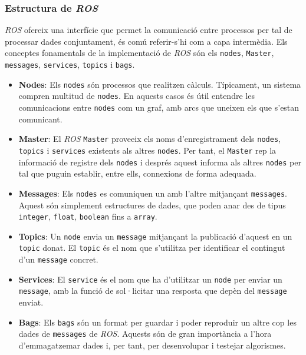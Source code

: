 \documentclass[12pt,a4paper,final,twoside]{report}
\begin{document}
\subsubsection{Estructura de \textit{ROS}}

\textit{ROS} ofereix una interfície que permet la comunicació entre processos per tal de processar dades conjuntament, és comú referir-s'hi com a capa intermèdia. Els conceptes fonamentals de la implementació de \textit{ROS} són els \texttt{nodes}, \texttt{Master}, \texttt{messages}, \texttt{services}, \texttt{topics} i \texttt{bags}.

\begin{itemize}
\item \textbf{Nodes}: Els \texttt{nodes} són processos que realitzen càlculs. Típicament, un sistema compren multitud de \texttt{nodes}. En aquests casos és útil entendre les comunicacions entre \texttt{nodes} com un graf, amb arcs que uneixen els que s'estan comunicant.

\item \textbf{Master}: El \textit{ROS} \texttt{Master} proveeix els noms d'enregistrament dels \texttt{nodes}, \texttt{topics} i \texttt{services} existents als altres \texttt{nodes}. Per tant, el \texttt{Master} rep la informació de registre dels \texttt{nodes} i després aquest informa als altres \texttt{nodes} per tal que puguin establir, entre ells, connexions de forma adequada. 

\item \textbf{Messages}: Els \texttt{nodes} es comuniquen un amb l'altre mitjançant \texttt{messages}. Aquest són simplement estructures de dades, que poden anar des de tipus \texttt{integer}, \texttt{float}, \texttt{boolean} fins a \texttt{array}.

\item \textbf{Topics}: Un \texttt{node} envia un \texttt{message} mitjançant la publicació d'aquest en un \texttt{topic} donat. El \texttt{topic} és el nom que s'utilitza per identificar el contingut d'un \texttt{message} concret. 

\item \textbf{Services}: El \texttt{service} és el nom que ha d'utilitzar un \texttt{node} per enviar un \texttt{message}, amb la funció de sol·licitar una resposta que depèn del \texttt{message} enviat.

\item \textbf{Bags}: Els \texttt{bags} són un format per guardar i poder reproduir un altre cop les dades de \texttt{messages} de \textit{ROS}. Aquests són de gran importància a l'hora d'emmagatzemar dades i, per tant, per desenvolupar i testejar algorismes.
\end{itemize}
\end{document}
